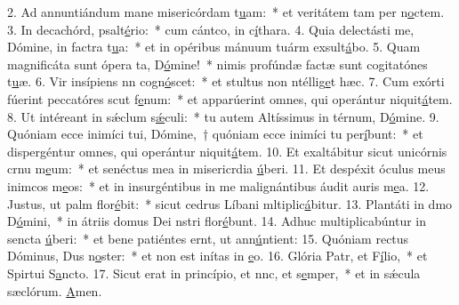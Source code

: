 2. Ad annuntiándum mane misericórdam t\uline{u}am:~* et veritátem tam per n\uline{o}ctem.
3. In decachórd, psalt\uline{é}rio:~* cum cántco, in c\uline{í}thara.
4. Quia delectásti me, Dómine, in factra t\uline{u}a:~* et in opéribus mánuum tuárm exsult\uline{á}bo.
5. Quam magnificáta sunt ópera ta, D\uline{ó}mine!~* nimis profúndæ factæ sunt cogitatónes t\uline{u}æ.
6. Vir insípiens nn cogn\uline{ó}scet:~* et stultus non ntéllig\uline{e}t hæc.
7. Cum exórti fúerint peccatóres scut f\uline{e}num:~* et apparúerint omnes, qui operántur niquit\uline{á}tem.
8. Ut intéreant in sǽclum s\uline{ǽ}culi:~* tu autem Altíssimus in térnum, D\uline{ó}mine.
9. Quóniam ecce inimíci tui, Dómine,~† quóniam ecce inimíci tu per\uline{í}bunt:~* et dispergéntur omnes, qui operántur niquit\uline{á}tem.
10. Et exaltábitur sicut unicórnis crnu m\uline{e}um:~* et senéctus mea in misericrdia \uline{ú}beri.
11. Et despéxit óculus meus inimcos m\uline{e}os:~* et in insurgéntibus in me malignántibus áudit auris m\uline{e}a.
12. Justus, ut palm flor\uline{é}bit:~* sicut cedrus Líbani mltiplic\uline{á}bitur.
13. Plantáti in dmo D\uline{ó}mini,~* in átriis domus Dei nstri flor\uline{é}bunt.
14. Adhuc multiplicabúntur in sencta \uline{ú}beri:~* et bene patiéntes ernt, ut ann\uline{ú}ntient:
15. Quóniam rectus Dóminus, Dus n\uline{o}ster:~* et non est inítas in \uline{e}o.
16. Glória Patr, et F\uline{í}lio,~* et Spirtui S\uline{a}ncto.
17. Sicut erat in princípio, et nnc, et s\uline{e}mper,~* et in sǽcula sæclórum. \uline{A}men.
